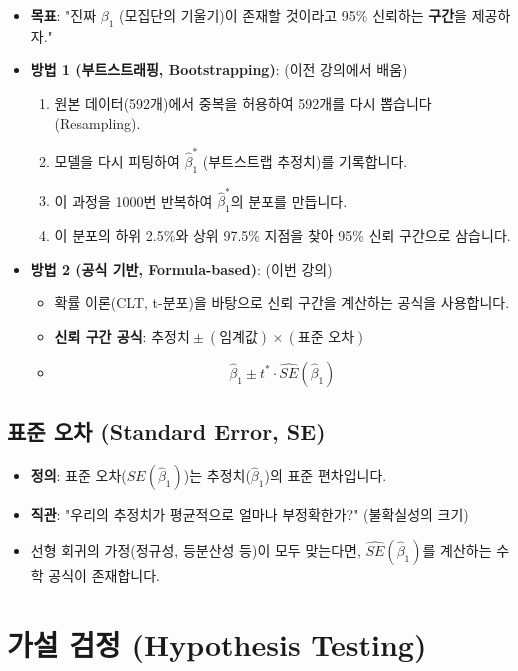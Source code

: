 \documentclass[11pt,a4paper]{book}
\theoremstyle{definition}
\begin{document}
\begin{itemize}
    \item \textbf{목표}: "진짜 $\beta_1$ (모집단의 기울기)이 존재할 것이라고 95\% 신뢰하는 \textbf{구간}을 제공하자."
    \item \textbf{방법 1 (부트스트래핑, Bootstrapping)}: (이전 강의에서 배움)
        \begin{enumerate}
            \item 원본 데이터(592개)에서 중복을 허용하여 592개를 다시 뽑습니다 (Resampling).
            \item 모델을 다시 피팅하여 $\hat{\beta}_1^*$ (부트스트랩 추정치)를 기록합니다.
            \item 이 과정을 1000번 반복하여 $\hat{\beta}_1^*$의 분포를 만듭니다.
            \item 이 분포의 하위 2.5\%와 상위 97.5\% 지점을 찾아 95\% 신뢰 구간으로 삼습니다.
        \end{enumerate}
    \item \textbf{방법 2 (공식 기반, Formula-based)}: (이번 강의)
        \begin{itemize}
            \item 확률 이론(CLT, t-분포)을 바탕으로 신뢰 구간을 계산하는 공식을 사용합니다.
            \item \textbf{신뢰 구간 공식}: $\text{추정치} \pm (\text{임계값}) \times (\text{표준 오차})$
            \item $$ \hat{\beta}_1 \pm t^* \cdot \hat{SE}(\hat{\beta}_1) $$
        \end{itemize}
\end{itemize}

\subsection{표준 오차 (Standard Error, SE)}
\begin{itemize}
    \item \textbf{정의}: 표준 오차($SE(\hat{\beta}_1)$)는 추정치($\hat{\beta}_1$)의 표준 편차입니다.
    \item \textbf{직관}: "우리의 추정치가 평균적으로 얼마나 부정확한가?" (불확실성의 크기)
    \item 선형 회귀의 가정(정규성, 등분산성 등)이 모두 맞는다면, $\hat{SE}(\hat{\beta}_1)$를 계산하는 수학 공식이 존재합니다.
\end{itemize}

\section{가설 검정 (Hypothesis Testing)}
\end{document}
